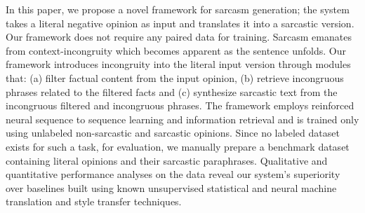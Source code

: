In this paper, we propose a novel framework for sarcasm generation; the system takes a literal negative opinion as input and translates it into a sarcastic version. Our framework does not require any paired data for training. Sarcasm emanates from context-incongruity which becomes apparent as the sentence unfolds. Our framework introduces incongruity into the literal input version through modules that: (a) filter factual content from the input opinion, (b) retrieve incongruous phrases related to the filtered facts and (c) synthesize sarcastic text from the incongruous filtered and incongruous phrases. The framework employs reinforced neural sequence to sequence learning and information retrieval and is trained only using unlabeled non-sarcastic and sarcastic opinions. Since no labeled dataset exists for such a task, for evaluation, we manually prepare a benchmark dataset containing literal opinions and their sarcastic paraphrases. Qualitative and quantitative performance analyses on the data reveal our system's superiority over baselines built using known unsupervised statistical and neural machine translation and style transfer techniques.